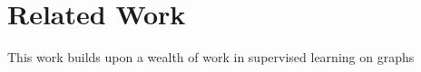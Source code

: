 \section{Related Work}\label{sec:related_work}
This work builds upon a wealth of work in supervised learning on graphs
